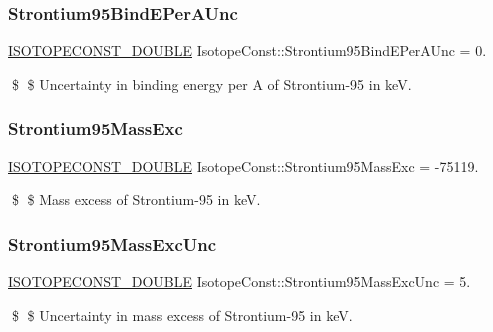 \subsubsection{\texorpdfstring{Strontium95\+Bind\+E\+Per\+A\+Unc}{Strontium95BindEPerAUnc}}
{\footnotesize\ttfamily \mbox{\hyperlink{group___isotope_const-_macros_ga8f45a7272ce02c0b4c65c44636ed719a}{I\+S\+O\+T\+O\+P\+E\+C\+O\+N\+S\+T\+\_\+\+D\+O\+U\+B\+LE}} Isotope\+Const\+::\+Strontium95\+Bind\+E\+Per\+A\+Unc = 0.}

\$ \$ Uncertainty in binding energy per A of Strontium-\/95 in keV. \mbox{\label{group___isotope_const-_strontium-_sr95_ga5cdc8de9109689d909d8e271396a0b07}} 
\subsubsection{\texorpdfstring{Strontium95\+Mass\+Exc}{Strontium95MassExc}}
{\footnotesize\ttfamily \mbox{\hyperlink{group___isotope_const-_macros_ga8f45a7272ce02c0b4c65c44636ed719a}{I\+S\+O\+T\+O\+P\+E\+C\+O\+N\+S\+T\+\_\+\+D\+O\+U\+B\+LE}} Isotope\+Const\+::\+Strontium95\+Mass\+Exc = -\/75119.}

\$ \$ Mass excess of Strontium-\/95 in keV. \mbox{\label{group___isotope_const-_strontium-_sr95_gad021eea25d541de9ef63242519f27508}} 
\subsubsection{\texorpdfstring{Strontium95\+Mass\+Exc\+Unc}{Strontium95MassExcUnc}}
{\footnotesize\ttfamily \mbox{\hyperlink{group___isotope_const-_macros_ga8f45a7272ce02c0b4c65c44636ed719a}{I\+S\+O\+T\+O\+P\+E\+C\+O\+N\+S\+T\+\_\+\+D\+O\+U\+B\+LE}} Isotope\+Const\+::\+Strontium95\+Mass\+Exc\+Unc = 5.}

\$ \$ Uncertainty in mass excess of Strontium-\/95 in keV. \mbox{\label{group___isotope_const-_strontium-_sr95_ga0de5bf14cceac5508b496b2c9f17cbac}} 
